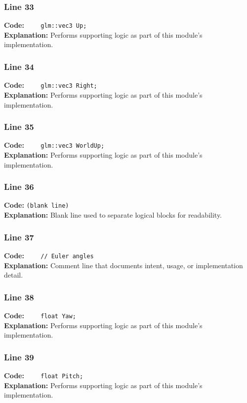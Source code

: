 \documentclass[11pt,a4paper]{article}
\begin{document}
\subsubsection*{Line 33}
\textbf{Code:} \verb|    glm::vec3 Up;|\\
\textbf{Explanation:} Performs supporting logic as part of this module's implementation.

\subsubsection*{Line 34}
\textbf{Code:} \verb|    glm::vec3 Right;|\\
\textbf{Explanation:} Performs supporting logic as part of this module's implementation.

\subsubsection*{Line 35}
\textbf{Code:} \verb|    glm::vec3 WorldUp;|\\
\textbf{Explanation:} Performs supporting logic as part of this module's implementation.

\subsubsection*{Line 36}
\textbf{Code:} \texttt{(blank line)}\\
\textbf{Explanation:} Blank line used to separate logical blocks for readability.

\subsubsection*{Line 37}
\textbf{Code:} \verb|    // Euler angles|\\
\textbf{Explanation:} Comment line that documents intent, usage, or implementation detail.

\subsubsection*{Line 38}
\textbf{Code:} \verb|    float Yaw;|\\
\textbf{Explanation:} Performs supporting logic as part of this module's implementation.

\subsubsection*{Line 39}
\textbf{Code:} \verb|    float Pitch;|\\
\textbf{Explanation:} Performs supporting logic as part of this module's implementation.
\end{document}
